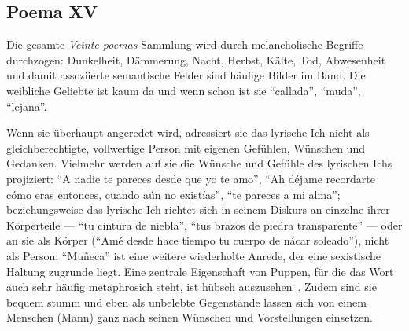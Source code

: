 \subsection{Poema XV}
Die gesamte \textit{Veinte poemas}-Sammlung wird durch melancholische Begriffe durchzogen:
Dunkelheit, Dämmerung, Nacht, Herbst, Kälte, Tod, Abwesenheit und damit assoziierte semantische Felder sind häufige Bilder im Band.
Die weibliche Geliebte ist kaum da und wenn schon ist sie ``callada'', ``muda'', ``lejana''.

Wenn sie überhaupt angeredet wird, adressiert sie das lyrische Ich nicht als gleichberechtigte, vollwertige Person mit eigenen Gefühlen, Wünschen und Gedanken.
Vielmehr werden auf sie die Wünsche und Gefühle des lyrischen Ichs projiziert:
``A nadie te pareces desde que yo te amo'', ``Ah déjame recordarte cómo eras entonces, cuando aún no existías'', ``te pareces a mi alma'';
beziehungsweise das lyrische Ich richtet sich in seinem Diskurs an einzelne ihrer Körperteile — ``tu cintura de niebla'', ``tus brazos de piedra transparente'' — oder an sie als Körper (``Amé desde hace tiempo tu cuerpo de nácar soleado''), nicht als Person. %
``Muñeca'' ist eine weitere wiederholte Anrede, der eine sexistische Haltung zugrunde liegt.
Eine zentrale Eigenschaft von Puppen, für die das Wort auch sehr häufig metaphrosich steht, ist hübsch auszusehen~\cite{Walter2010}. %
Zudem sind sie bequem stumm und eben als unbelebte Gegenstände lassen sich von einem Menschen (Mann) ganz nach seinen Wünschen und Vorstellungen einsetzen. %

